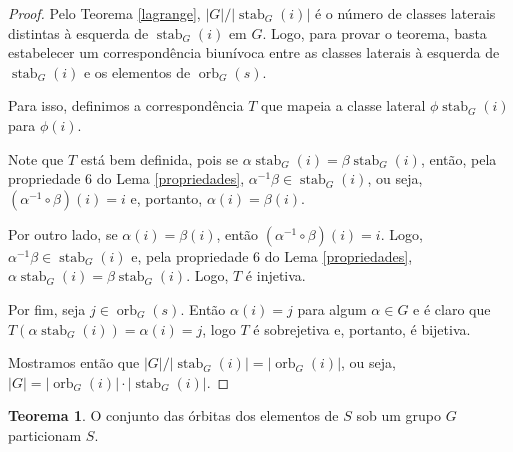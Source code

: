 \documentclass[a4paper,portuguese,11pt,twoside, leqno]{book}
\DeclareMathOperator{\stab}{stab}
\DeclareMathOperator{\orb}{orb}
\theoremstyle{definition}
\newtheorem{theorem}{Teorema}[section]
\begin{document}
	\begin{proof}
		Pelo Teorema \eqref{lagrange}, $|G|/|\stab_G(i)|$ é o número de classes laterais distintas à esquerda de $\stab_G(i)$ em $G$. Logo, para provar o teorema, basta estabelecer um correspondência biunívoca entre as classes laterais à esquerda de $\stab_G(i)$ e os elementos de $\orb_G(s)$. 
		\par\vspace{0.3cm} Para isso, definimos a correspondência $T$ que mapeia a classe lateral $\phi\stab_G(i)$ para $\phi(i)$. 
		\par\vspace{0.3cm} Note que $T$ está bem definida, pois se $\alpha\stab_G(i) = \beta\stab_G(i)$, então, pela propriedade 6 do Lema \eqref{propriedades}, $\alpha^{-1}\beta\in\stab_G(i)$, ou seja, $(\alpha^{-1}\circ\beta)(i) = i$ e, portanto, $\alpha(i) = \beta(i)$.
		\par\vspace{0.3cm} Por outro lado, se $\alpha(i) = \beta(i)$, então $(\alpha^{-1}\circ\beta)(i) = i$. Logo, $\alpha^{-1}\beta\in\stab_G(i)$ e, pela propriedade 6 do Lema \eqref{propriedades}, $\alpha\stab_G(i) = \beta\stab_G(i)$. Logo, $T$ é injetiva. 
		\par\vspace{0.3cm} Por fim, seja $j\in\orb_G(s)$. Então $\alpha(i) = j$ para algum $\alpha \in G$ e é claro que $T(\alpha\stab_G(i)) = \alpha(i) = j$, logo $T$ é sobrejetiva e, portanto, é bijetiva.
		\par\vspace{0.3cm} Mostramos então que $|G|/|\stab_G(i)| = |\orb_G(i)|$, ou seja, $|G| = |\orb_G(i)|\cdot|\stab_G(i)|$. 
		
	\end{proof}
	
	\begin{theorem}
		\label{part}
		O conjunto das órbitas dos elementos de $S$ sob um grupo $G$ particionam $S$.
	\end{theorem}
	
\end{document}
